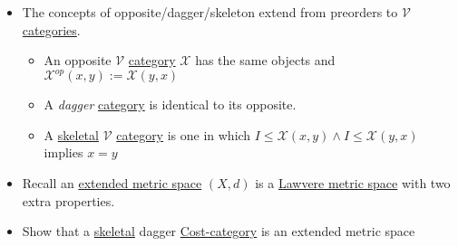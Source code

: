 \begin{itemize}
    \item  The concepts of opposite/dagger/skeleton extend from preorders to $\mathcal{V}$ \hyperref[D2.46]{categories}.
          \begin{itemize}
            \item An opposite $\mathcal{V}$ \hyperref[D2.46]{category} $\mathcal{X}$ has the same objects and $\mathcal{X}^{op}(x,y):=\mathcal{X}(y,x)$
            \item A \emph{dagger} \hyperref[D2.46]{category} is identical to its opposite.
            \item A \hyperref[D1.35]{skeletal} $\mathcal{V}$ \hyperref[D2.46]{category} is one in which $I \leq \mathcal{X}(x,y) \land I \leq \mathcal{X}(y,x)$ implies $x = y$
          \end{itemize}
    \item Recall an \hyperref[D2.51]{extended metric space} $(X,d)$ is a \hyperref[D2.53]{Lawvere metric space} with two extra properties.
    \item Show that a \hyperref[D1.35]{skeletal} dagger \hyperref[D2.53]{Cost-category} is an extended metric space

  \end{itemize}